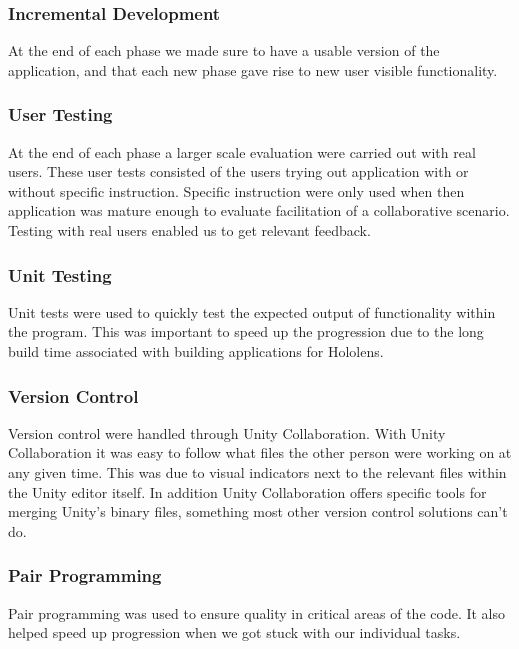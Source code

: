             \subsubsection{Incremental Development}
                At the end of each phase we made sure to have a usable version of the application, and that each new phase gave rise to new user visible functionality.
        
            \subsubsection{User Testing}
                At the end of each phase a larger scale evaluation were carried out with real users. These user tests consisted of the users trying out application with or without specific instruction. Specific instruction were only used when then application was mature enough to evaluate facilitation of a collaborative scenario. Testing with real users enabled us to get relevant feedback.
                
            \subsubsection{Unit Testing}
                Unit tests were used to quickly test the expected output of functionality within the program. This was important to speed up the progression due to the long build time associated with building applications for Hololens.
                
            \subsubsection{Version Control}
                Version control were handled through Unity Collaboration. With Unity Collaboration it was easy to follow what files the other person were working on at any given time. This was due to visual indicators next to the relevant files within the Unity editor itself. In addition Unity Collaboration offers specific tools for merging Unity's binary files, something most other version control solutions can't do.
            
            \subsubsection{Pair Programming}
                Pair programming was used to ensure quality in critical areas of the code. It also helped speed up progression when we got stuck with our individual tasks.
                

